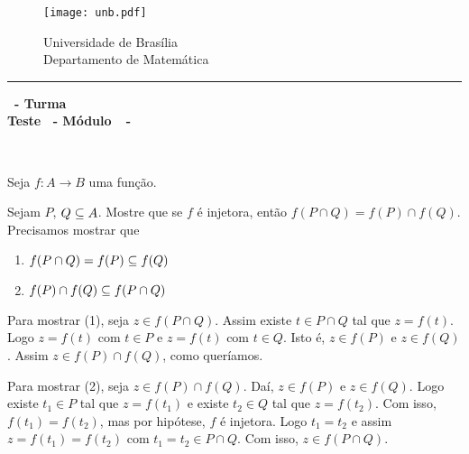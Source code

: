 \documentclass[12pt]{exam}
\begin{document}
    \begin{figure}[h]
        \begin{minipage}[c]{1.7cm}
            \texttt{[image: unb.pdf]}
        \end{minipage}
        \hspace{0pt}
        \begin{minipage}[c]{4in}
            {Universidade de Brasília} \\
            {Departamento de Matemática}
        \end{minipage}
    \end{figure}
    \hrule
    \begin{center}
        {\Large\bf \disciplina\ - Turma \turma}  \\
         {\large\bf Teste \numeroteste\ - Módulo\ \modulo\ -\ \dataavaliacao}
    \end{center}

    \\
    \vspace*{.01cm}

    \vspace{.4cm}

    \noindent Seja $f : A \to B$ uma função.

    \vspace{.4cm}

    \questao Sejam $P$, $Q \subseteq A$. Mostre que se $f$ é injetora, então $f(P \cap Q) = f(P) \cap f(Q)$.
    \noindent\solucao Precisamos mostrar que
    \begin{enumerate}
        \item $f(P \cap Q) = f(P) \subseteq f(Q)$
        \item $f(P) \cap f(Q) \subseteq f(P \cap Q)$
    \end{enumerate}

    Para mostrar (1), seja $z \in f(P \cap Q)$. Assim existe $t \in P \cap Q$ tal que $z = f(t)$.
    Logo $z = f(t)$ com $t \in P$ e $z = f(t)$ com $t \in Q$. Isto é, $z \in f(P)$ e $z \in f(Q)$.
    Assim $z \in f(P) \cap f(Q)$, como queríamos.

    Para mostrar (2), seja $z \in f(P) \cap f(Q)$. Daí, $z \in f(P)$ e $z \in f(Q)$. Logo existe
    $t_1 \in P$ tal que $z = f(t_1)$ e existe $t_2 \in Q$ tal que $z = f(t_2)$. Com isso, $f(t_1) = f(t_2)$,
    mas por hipótese, $f$ é injetora. Logo $t_1 = t_2$ e assim $z = f(t_1) = f(t_2)$ com $t_1 = t_2 \in P \cap Q$.
    Com isso, $z \in f(P \cap Q)$.
\end{document}
